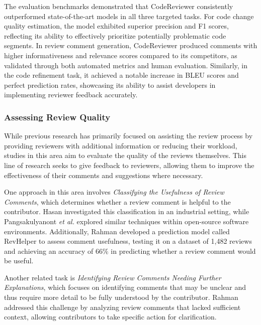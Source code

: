 The evaluation benchmarks demonstrated that CodeReviewer consistently
outperformed state-of-the-art models in all three targeted tasks. For code
change quality estimation, the model exhibited superior precision and F1
scores, reflecting its ability to effectively prioritize potentially
problematic code segments. In review comment generation, CodeReviewer produced
comments with higher informativeness and relevance scores compared to its
competitors, as validated through both automated metrics and human evaluation.
Similarly, in the code refinement task, it achieved a notable increase in BLEU
scores and perfect prediction rates, showcasing its ability to assist
developers in implementing reviewer feedback accurately.

\subsubsection{Assessing Review Quality}

While previous research has primarily focused on assisting the review process
by providing reviewers with additional information or reducing their workload,
studies in this area aim to evaluate the quality of the reviews themselves.
This line of research seeks to give feedback to reviewers, allowing them to
improve the effectiveness of their comments and suggestions where necessary.

One approach in this area involves \textit{Classifying the Usefulness of Review
	Comments}, which determines whether a review comment is helpful to the
contributor. Hasan \etal \cite{hasan:emse2021} investigated this classification
in an industrial setting, while Pangsakulyanont \textit{et
	al.}\cite{pangsakulyanont:iwesep2014} explored similar techniques within
open-source software environments. Additionally, Rahman \etal
\cite{rahman:msr2017} developed a prediction model called RevHelper to assess
comment usefulness, testing it on a dataset of 1,482 reviews and achieving an
accuracy of 66\% in predicting whether a review comment would be useful.

Another related task is \textit{Identifying Review Comments Needing Further
	Explanations}, which focuses on identifying comments that may be unclear and
thus require more detail to be fully understood by the contributor. Rahman
\etal \cite{rahman:esem2022} addressed this challenge by analyzing review
comments that lacked sufficient context, allowing contributors to take specific
action for clarification.

